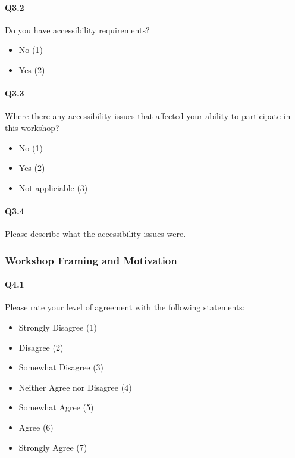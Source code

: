 \documentclass[030-workshop.tex]{subfiles}
\begin{document}
    \paragraph{Q3.2}

        Do you have accessibility requirements?

        \begin{itemize}
            \item No  (1)
            \item Yes  (2)
        \end{itemize}

    \paragraph{Q3.3}

        Where there any accessibility issues that affected your ability to participate in this workshop?

        \begin{itemize}
            \item No  (1)
            \item Yes  (2)
            \item Not appliciable  (3)
        \end{itemize}


    \paragraph{Q3.4}

        Please describe what the accessibility issues were.

\subsubsection{Workshop Framing and Motivation}

    \paragraph{Q4.1}

        Please rate your level of agreement with the following statements:

        \begin{itemize}
            \item Strongly Disagree (1)
            \item Disagree (2)
            \item Somewhat Disagree (3)
            \item Neither Agree nor Disagree (4)
            \item Somewhat Agree (5)
            \item Agree (6)
            \item Strongly Agree (7)
        \end{itemize}
\end{document}
